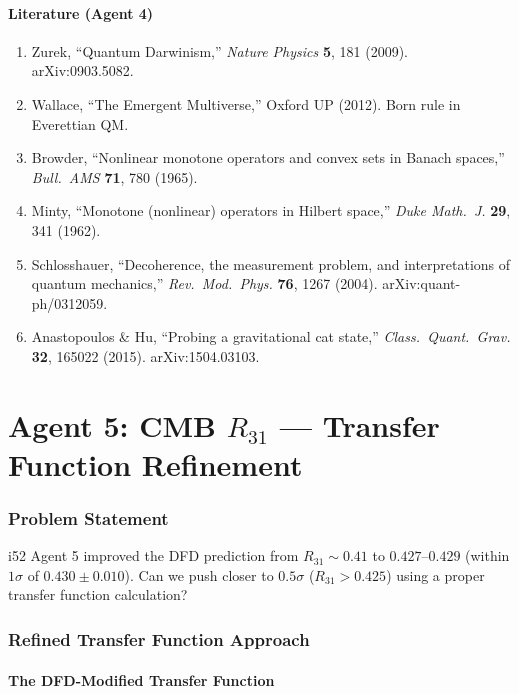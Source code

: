 \documentclass[11pt,a4paper]{article}
\begin{document}
\subsection{Literature (Agent 4)}

\begin{enumerate}
\item Zurek, ``Quantum Darwinism,'' \textit{Nature Physics} \textbf{5}, 181 (2009). arXiv:0903.5082.
\item Wallace, ``The Emergent Multiverse,'' Oxford UP (2012). Born rule in Everettian QM.
\item Browder, ``Nonlinear monotone operators and convex sets in Banach spaces,'' \textit{Bull.\ AMS} \textbf{71}, 780 (1965).
\item Minty, ``Monotone (nonlinear) operators in Hilbert space,'' \textit{Duke Math.\ J.} \textbf{29}, 341 (1962).
\item Schlosshauer, ``Decoherence, the measurement problem, and interpretations of quantum mechanics,'' \textit{Rev.\ Mod.\ Phys.} \textbf{76}, 1267 (2004). arXiv:quant-ph/0312059.
\item Anastopoulos \& Hu, ``Probing a gravitational cat state,'' \textit{Class.\ Quant.\ Grav.} \textbf{32}, 165022 (2015). arXiv:1504.03103.
\end{enumerate}


\part{Agent 5: CMB $R_{31}$ --- Transfer Function Refinement}
\label{part:cmb-r31}

\section{Problem Statement}

i52 Agent 5 improved the DFD prediction from $R_{31} \sim 0.41$ to $0.427$--$0.429$ (within $1\sigma$ of $0.430 \pm 0.010$). Can we push closer to $0.5\sigma$ ($R_{31} > 0.425$) using a proper transfer function calculation?

\section{Refined Transfer Function Approach}

\subsection{The DFD-Modified Transfer Function}
\end{document}

